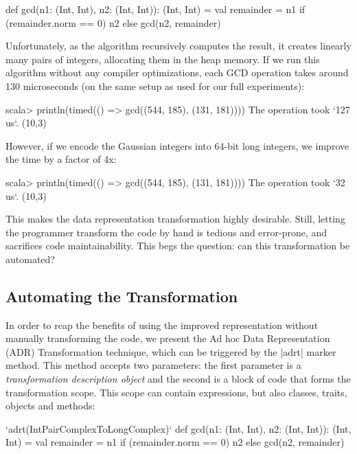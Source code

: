\begin{lstlisting-nobreak}
def gcd(n1: (Int, Int), n2: (Int, Int)): (Int, Int) = {
  val remainder = n1 %
  if (remainder.norm == 0) n2 else gcd(n2, remainder)
}
\end{lstlisting-nobreak}

Unfortunately, as the algorithm recursively computes the result, it creates linearly many pairs of integers, allocating them in the heap memory. If we run this algorithm without any compiler
optimizations, each GCD operation takes around 130
microseconds (on the same setup as used for our full experiments):

\begin{lstlisting-nobreak}
scala>   println(timed(() => gcd((544, 185), (131, 181))))
The operation took `127 us`.
(10,3)
\end{lstlisting-nobreak}

However, if we encode the Gaussian integers into 64-bit long integers, we improve the time by a factor of 4x:

\begin{lstlisting-nobreak}
scala> println(timed(() => gcd((544, 185), (131, 181))))
The operation took `32 us`.
(10,3)
\end{lstlisting-nobreak}

This makes the data representation transformation highly desirable. Still, letting the programmer transform the code by hand is tedious and error-prone, and sacrifices code maintainability. This begs the question: can this transformation be automated?

\subsection{Automating the Transformation}

In order to reap the benefits of using the improved representation
without manually transforming the code, we present the Ad hoc Data
Representation (ADR) Transformation technique, which can be triggered
by the |adrt| marker method. This method accepts two parameters: the
first parameter is a \emph{transformation description object} and the
second is a block of code that forms the transformation scope. This
scope can contain expressions, but also classes, traits, objects and
methods:

\begin{lstlisting-nobreak}
`adrt(IntPairComplexToLongComplex)` {
  def gcd(n1: (Int, Int), n2: (Int, Int)): (Int, Int) = {
    val remainder = n1 %
    if (remainder.norm == 0) n2 else gcd(n2, remainder)
  }
}
\end{lstlisting-nobreak}

